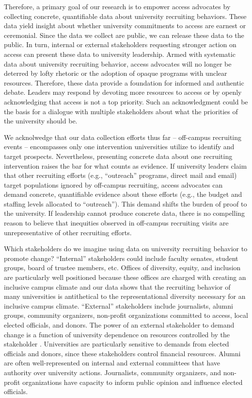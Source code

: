 \documentclass[twoside]{article}
\begin{document}
Therefore, a primary goal of our research is to empower access advocates by collecting concrete, quantifiable data about university recruiting behaviors. These data yield insight about whether university commitments to access are earnest or ceremonial.  Since the data we collect are public, we can release these data to the public. In turn, internal or external stakeholders requesting stronger action on access can present these data to university leadership.  Armed with systematic data about university recruiting behavior, access advocates will no longer be deterred by lofty rhetoric or the adoption of opaque programs with unclear resources.  Therefore, these data provide a foundation for informed and authentic debate.  Leaders may respond by devoting more resources to access or by openly acknowledging that access is not a top priority. Such an acknowledgment could be the basis for a dialogue with multiple stakeholders about what the priorities of the university should be.

We acknolwedge that our data collection efforts thus far -- off-campus recruiting events -- encompasses only one intervention universities utilize to identify and target prospects. Nevertheless, presenting concrete data about one recruiting intervention raises the bar for what counts as evidence. If university leaders claim that other recruiting efforts (e.g., ``outreach'' programs, direct mail and email) target populations ignored by off-campus recruiting, access advocates can demand concrete, quantifiable evidence about these efforts (e.g., the budget and staffing levels allocated to ``outreach'').  This demand shifts the burden of proof to the university. If leadership cannot produce concrete data, there is no compelling reason to believe that inequities observed in off-campus recruiting visits are unrepresentative of other recruiting efforts. 

Which stakeholders do we imagine using data on university recruiting behavior to promote change? ``Internal'' stakeholders could include faculty senates, student groups, board of trustee members, etc. Offices of diversity, equity, and inclusion are particularly well positioned because these offices are charged with creating an inclusive campus climate and our data shows that the recruiting behavior of many universities is antithetical to the representational diversity necessary for an inclusive campus climate.  ``External'' stakeholders include journalists, alumni groups, community organizers, non-profit organizations committed to access, local elected officials, and donors.  The power of an external stakeholder to demand change is a function of university dependence on resources controlled by the stakeholder \citep{RN959}. Universities are particularly sensitive to demands from elected officials and donors, since these stakeholders control financial resources.  Alumni are often well-represented on internal and external committees that have authority over university actions.  Journalists, community organizers, and non-profit organizations have capacity to inform public opinion and influence elected officials.
\end{document}
